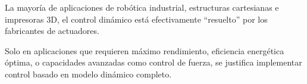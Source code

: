 La mayoría de aplicaciones de robótica industrial, estructuras cartesianas e impresoras 3D, el control dinámico está efectivamente ``resuelto'' por los fabricantes de actuadores. 

Solo en aplicaciones que requieren máximo rendimiento, eficiencia energética óptima, o capacidades avanzadas como control de fuerza, se justifica implementar control basado en modelo dinámico completo.
